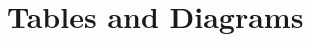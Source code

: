 \documentclass[10pt]{article}
\begin{document}




\pagebreak[4]


\section {Tables and Diagrams}


\end{document}
